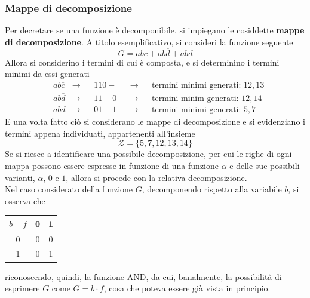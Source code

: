 \documentclass[a4paper]{extarticle}
\renewcommand\arraystretch{}
\begin{document}
\vspace{1em}
\noindent
\subsubsection{Mappe di decomposizione}
Per decretare se una funzione è decomponibile, si impiegano le cosiddette \textbf{mappe di decomposizione}. A titolo esemplificativo, si consideri la funzione seguente
\[G=ab\overline{c}+ab\overline{d}+\overline{a}bd\]
Allora si considerino i termini di cui è composta, e si determinino i termini minimi da essi generati
\begin{align*}
    &ab\overline{c} &\rightarrow&&110- &&\rightarrow&&\text{termini minimi generati: } 12,13\\
    &ab\overline{d} &\rightarrow&&11-0 &&\rightarrow&&\text{termini minim generati: } 12,14\\
    &\overline{a}bd &\rightarrow&&01-1 &&\rightarrow&&\text{termini minimi generati: } 5,7
\end{align*}
E una volta fatto ciò si considerano le mappe di decomposizione e si evidenziano i termini appena individuati, appartenenti all'insieme
\[\mathcal{Z}=\{5,7,12,13,14\}\]
Se si riesce a identificare una possibile decomposizione, per cui le righe di ogni mappa possono essere espresse in funzione di una funzione $\alpha$ e delle sue possibili varianti, $\overline{\alpha}$, $0$ e $1$, allora si procede con la relativa decomposizione.\\
Nel caso considerato della funzione $G$, decomponendo rispetto alla variabile $b$, si osserva che

\vspace{1em}
\noindent
\begin{table}[H]
\setlength{\tabcolsep}{4pt}
\renewcommand{\arraystretch}{1.2}
\centering
\begin{tabular}{|c|c|c|}
    \hline
    $b-f$ & 0 & 1\\
    \hline
    0     & 0 & 0\\
    \hline
    1     & 0 & 1\\
    \hline
\end{tabular}
\end{table}

\vspace{1em}
\noindent
riconoscendo, quindi, la funzione AND, da cui, banalmente, la possibilità di esprimere $G$ come $G=b \cdot f$, cosa che poteva essere già vista in principio.
\end{document}
